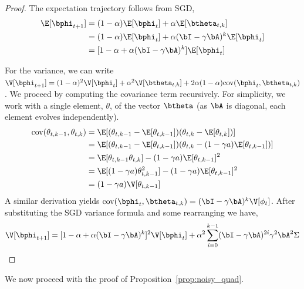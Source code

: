 \begin{proof}
The expectation trajectory follows from SGD,
\begin{align*}
    \E[\bphi_{t+1}] &= (1-\alpha) \E[\bphi_{t}] + \alpha \E[\btheta_{t,k}] \\
    &= (1-\alpha) \E[\bphi_{t}] + \alpha (\bI - \gamma \bA)^k \E[\bphi_{t}] \\
    &= [1 - \alpha + \alpha (\bI - \gamma \bA)^k] \E[\bphi_{t}]
\end{align*}

For the variance, we can write $\V[\bphi_{t+1}] = (1-\alpha)^2 \V[\bphi_{t}] + \alpha^2 \V[\btheta_{t,k}] + 2\alpha(1-\alpha)\text{cov}(\bphi_t, \btheta_{t,k})$. We proceed by computing the covariance term recursively. For simplicity, we work with a single element, $\theta$, of the vector $\btheta$ (as $\bA$ is diagonal, each element evolves independently).
\begin{align*}
    \text{cov}(\theta_{t,k-1}, \theta_{t,k}) &= \E[(\theta_{t,k-1} - \E[\theta_{t,k-1}])(\theta_{t,k} - \E[\theta_{t,k}])] \\
    &= \E[(\theta_{t,k-1} - \E[\theta_{t,k-1}])(\theta_{t,k} - (1-\gamma a)\E[\theta_{t,k-1}])] \\
    &= \E[\theta_{t,k-1}\theta_{t,k}] - (1 - \gamma a)\E[\theta_{t,k-1}]^2 \\
    &= \E[(1-\gamma a)\theta^2_{t,k-1}] - (1 - \gamma a)\E[\theta_{t,k-1}]^2 \\
    &= (1-\gamma a)\V[\theta_{t,k-1}]
\end{align*}
A similar derivation yields $\text{cov}(\bphi_t, \btheta_{t,k}) = (\bI - \gamma \bA)^k \V[\phi_t]$. After substituting the SGD variance formula and some rearranging we have,
\begin{equation*}
    \V[\bphi_{t+1}] = [1-\alpha + \alpha (\bI - \gamma \bA)^k]^2\V[\bphi_t] + \alpha^2 \sum_{i=0}^{k-1} (\bI - \gamma \bA)^{2i}\gamma^2\bA^2\Sigma
\end{equation*}
\end{proof}
We now proceed with the proof of Proposition~\ref{prop:noisy_quad}.

